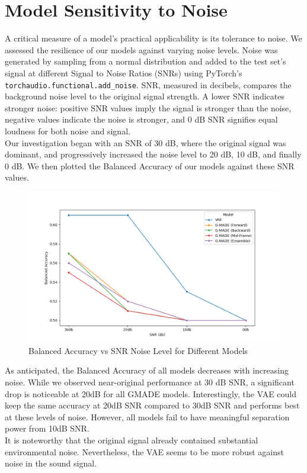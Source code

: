 \section{Model Sensitivity to Noise}
A critical measure of a model's practical applicability is its tolerance to noise. We assessed the resilience of our models against varying noise levels. Noise was generated by sampling from a normal distribution and added to the test set's signal at different Signal to Noise Ratios (SNRs) using PyTorch's \lstinline{torchaudio.functional.add_noise}. SNR, measured in decibels, compares the background noise level to the original signal strength. A lower SNR indicates stronger noise: positive SNR values imply the signal is stronger than the noise, negative values indicate the noise is stronger, and 0 dB SNR signifies equal loudness for both noise and signal.\\
Our investigation began with an SNR of 30 dB, where the original signal was dominant, and progressively increased the noise level to 20 dB, 10 dB, and finally 0 dB. We then plotted the Balanced Accuracy of our models against these SNR values.
\begin{figure}[h!]
    \includegraphics[width=\linewidth]{images/snr_balacc}
    \caption{
    Balanced Accuracy vs SNR Noise Level for Different Models
}
\end{figure}

As anticipated, the Balanced Accuracy of all models decreases with increasing noise. While we observed near-original performance at 30 dB SNR, a significant drop is noticeable at 20dB for all GMADE models. Interestingly, the VAE could keep the same accuracy at 20dB SNR compared to 30dB SNR and performs best at these levels of noise. However, all models fail to have meaningful separation power from 10dB SNR.\\
It is noteworthy that the original signal already contained substantial environmental noise. Nevertheless, the VAE seems to be more robust against noise in the sound signal.

